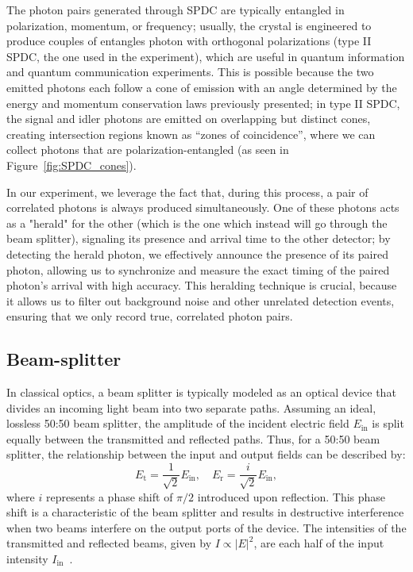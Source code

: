 \documentclass[prl,twocolumn]{revtex4-1}
\begin{document}
The photon pairs generated through SPDC are typically entangled in polarization, momentum, or frequency; usually, the crystal is engineered to produce couples of entangles photon with orthogonal polarizations (type II SPDC, the one used in the experiment), which are useful in quantum information and quantum communication experiments. This is possible because the two emitted photons each follow a cone of emission with an angle determined by the energy and momentum conservation laws previously presented; in type II SPDC, the signal and idler photons are emitted on overlapping but distinct cones, creating intersection regions known as ``zones of coincidence'', where we can collect photons that are polarization-entangled (as seen in Figure~\ref{fig:SPDC_cones}). 

In our experiment, we leverage the fact that, during this process, a pair of correlated photons is always produced simultaneously. One of these photons acts as a "herald" for the other (which is the one which instead will go through the beam splitter), signaling its presence and arrival time to the other detector; by detecting the herald photon, we effectively announce the presence of its paired photon, allowing us to synchronize and measure the exact timing of the paired photon's arrival with high accuracy. This heralding technique is crucial, because it allows us to filter out background noise and other unrelated detection events, ensuring that we only record true, correlated photon pairs.

\subsection{Beam-splitter}
\label{sec:beam_splitter}
In classical optics, a beam splitter is typically modeled as an optical device that divides an incoming light beam into two separate paths. Assuming an ideal, lossless 50:50 beam splitter, the amplitude of the incident electric field \( E_{\text{in}} \) is split equally between the transmitted and reflected paths. Thus, for a 50:50 beam splitter, the relationship between the input and output fields can be described by:
%
\begin{equation}
    E_{\text{t}} = \frac{1}{\sqrt{2}} E_{\text{in}}, \quad E_{\text{r}} = \frac{i}{\sqrt{2}} E_{\text{in}},
\end{equation}
%
where \( i \) represents a phase shift of \(\pi/2\) introduced upon reflection. This phase shift is a characteristic of the beam splitter and results in destructive interference when two beams interfere on the output ports of the device. The intensities of the transmitted and reflected beams, given by \( I \propto |E|^2 \), are each half of the input intensity \( I_{\text{in}} \)~\cite{pap2}.
\end{document}
